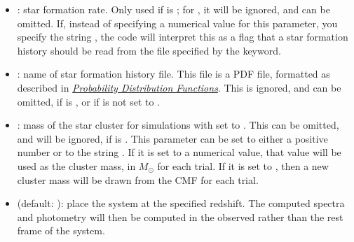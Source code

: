 \documentclass[letterpaper,10pt,english]{sphinxmanual}
\begin{document}
\begin{itemize}
\item {} 
: star formation rate. Only used if  is ; for , it will be ignored, and can be omitted. If, instead of specifying a numerical value for this parameter, you specify the string , the code will interpret this as a flag that a star formation history should be read from the file specified by the  keyword.

\item {} 
: name of star formation history file. This file is a PDF file, formatted as described in {\hyperref[pdfs:sec\string-pdfs]{\emph{Probability Distribution Functions}}}. This is ignored, and can be omitted, if  is , or if  is not set to .

\item {} 
: mass of the star cluster for simulations with  set to . This can be omitted, and will be ignored, if  is . This parameter can be set to either a positive number or to the string . If it is set to a numerical value, that value will be used as the cluster mass, in \(M_\odot\) for each trial. If it is set to , then a new cluster mass will be drawn from the CMF for each trial.

\item {} 
 (default: ): place the system at the specified redshift. The computed spectra and photometry will then be computed in the observed rather than the rest frame of the system.

\end{itemize}
\end{document}
